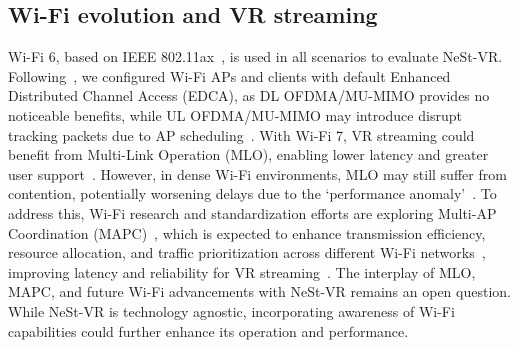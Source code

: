 \subsection{Wi-Fi evolution and VR streaming}

Wi-Fi 6, based on IEEE 802.11ax~\cite{bellalta2016ieee, khorov2018tutorial}, is used in all scenarios to evaluate NeSt-VR. Following~\cite{michaelides2025lessons}, we configured Wi-Fi APs and clients with default Enhanced Distributed Channel Access (EDCA), as DL OFDMA/MU-MIMO provides no noticeable benefits, while UL OFDMA/MU-MIMO may introduce disrupt tracking packets due to AP scheduling~\cite{michaelides2023wi}. With Wi-Fi 7, VR streaming could benefit from Multi-Link Operation (MLO), enabling lower latency and greater user support~\cite{carrascosa2024performance}. However, in dense Wi-Fi environments, MLO may still suffer from contention, potentially worsening delays due to the `performance anomaly'~\cite{carrascosa2023understanding}. To address this, Wi-Fi research and standardization efforts are exploring Multi-AP Coordination (MAPC)~\cite{galati2024will}, which is expected to enhance transmission efficiency, resource allocation, and traffic prioritization across different Wi-Fi networks~\cite{nunez2023multi}, improving latency and reliability for VR streaming~\cite{chemrov2023support}. The interplay of MLO, MAPC, and future Wi-Fi advancements with NeSt-VR remains an open question. While NeSt-VR is technology agnostic, incorporating awareness of Wi-Fi capabilities could further enhance its operation and performance.

